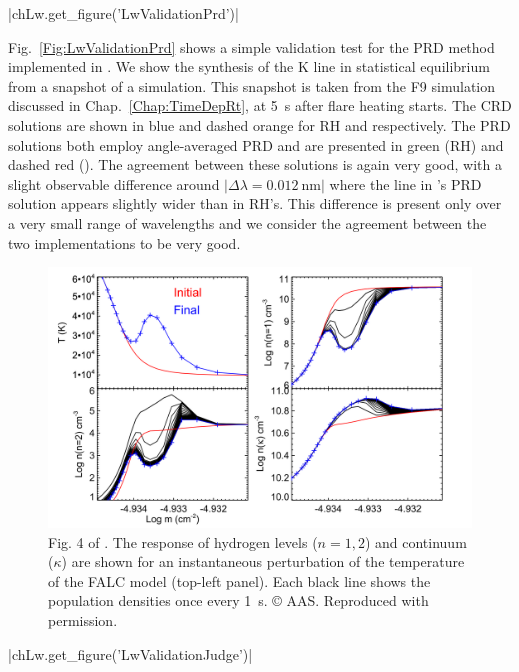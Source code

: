 \py[Lw]|chLw.get_figure('LwValidationPrd')|

Fig.~\ref{Fig:LwValidationPrd} shows a simple validation test for the PRD method implemented in \Lw{}.
We show the synthesis of the \Caii{} K line in statistical equilibrium from a snapshot of a \Radyn{} simulation.
This snapshot is taken from the F9 simulation discussed in Chap.~\ref{Chap:TimeDepRt}, at \SI{5}{\second} after flare heating starts.
The CRD solutions are shown in blue and dashed orange for RH and \Lw{} respectively.
The PRD solutions both employ angle-averaged PRD and are presented in green (RH) and dashed red (\Lw{}).
The agreement between these solutions is again very good, with a slight observable difference around $|\Delta\lambda=\SI{0.012}{\nano\metre}|$ where the line in \Lw{}'s PRD solution appears slightly wider than in RH's.
This difference is present only over a very small range of wavelengths and we consider the agreement between the two implementations to be very good.

\begin{figure}[p]
    \centering
    \includegraphics[width=0.85\columnwidth]{01aFlareModelling/StaticFigs/Judge2017Fig4.png}
    \caption[Fig. 4 of Judge (2017). Time-dependent response of hydrogen populations to instantaneous temperature change.]{Fig. 4 of \citet{Judge2017}. The response of hydrogen levels ($n=1, 2$) and continuum ($\kappa$) are shown for an instantaneous perturbation of the temperature of the FALC model (top-left panel). Each black line shows the population densities once every \SI{1}{\second}. © AAS. Reproduced with permission.}
    \label{Fig:Judge2017Original}
\end{figure}
\py[Lw]|chLw.get_figure('LwValidationJudge')|

